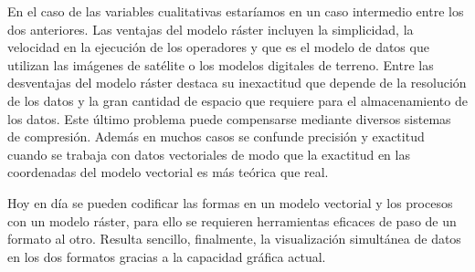 En el caso de las variables cualitativas estaríamos en un caso intermedio entre los dos anteriores.
Las ventajas del modelo ráster incluyen la simplicidad, la velocidad en la ejecución de los operadores y que es
el modelo de datos que utilizan las imágenes de satélite o los modelos digitales de terreno. Entre las desventajas
del modelo ráster destaca su inexactitud que depende de la resolución de los datos y la gran cantidad de espacio
que requiere para el almacenamiento de los datos. Este último problema puede compensarse mediante diversos
sistemas de compresión. Además en muchos casos se confunde precisión y exactitud cuando se trabaja con
datos vectoriales de modo que la exactitud en las coordenadas del modelo vectorial es más teórica que real.

Hoy en día se pueden codificar las formas en un modelo vectorial y los procesos con un modelo ráster,
para ello se requieren herramientas eficaces de paso de un formato al otro. Resulta sencillo, finalmente, la
visualización simultánea de datos en los dos formatos gracias a la capacidad gráfica actual.
